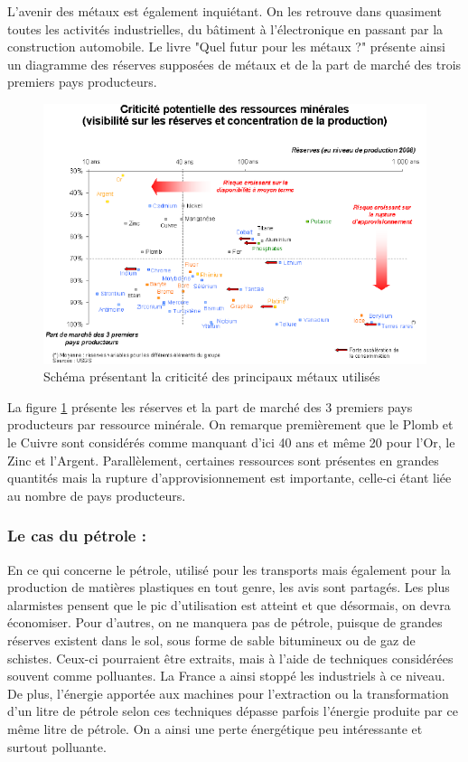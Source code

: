 L'avenir des métaux est également inquiétant. On les retrouve dans quasiment toutes les activités industrielles, du bâtiment à l’électronique en passant par la construction automobile. Le livre "Quel futur pour les métaux ?" \cite{LivreFuturMetaux} présente ainsi un diagramme des réserves supposées de métaux et de la part de marché des trois premiers pays producteurs.

\begin{figure}[h]
\includegraphics[scale=0.75]{Rsc/risquemetaux.png}
\caption{Schéma présentant la criticité des principaux métaux utilisés}
\label{CriticiteMetaux}%
\end{figure}

\bigbreak La figure \ref{CriticiteMetaux} présente les réserves et la part de marché des 3 premiers pays producteurs par ressource minérale. On remarque premièrement que le Plomb et le Cuivre sont considérés comme manquant d'ici 40 ans et même 20 pour l'Or, le Zinc et l'Argent. Parallèlement, certaines ressources sont présentes en grandes quantités mais la rupture d'approvisionnement est importante, celle-ci étant liée au nombre de pays producteurs.


\subsubsection{Le cas du pétrole : }

En ce qui concerne le pétrole, utilisé pour les transports mais également pour la production de matières plastiques en tout genre, les avis sont partagés. Les plus alarmistes pensent que le pic d'utilisation est atteint et que désormais, on devra économiser. Pour d'autres, on ne manquera pas de pétrole, puisque de grandes réserves existent dans le sol, sous forme de sable bitumineux ou de gaz de schistes. Ceux-ci pourraient être extraits, mais à l'aide de techniques considérées souvent comme polluantes. La France a ainsi stoppé les industriels à ce niveau. De plus, l'énergie apportée aux machines pour l'extraction ou la transformation d'un litre de pétrole selon ces techniques dépasse parfois l’énergie produite par ce même litre de pétrole. On a ainsi une perte énergétique peu intéressante et surtout polluante.

